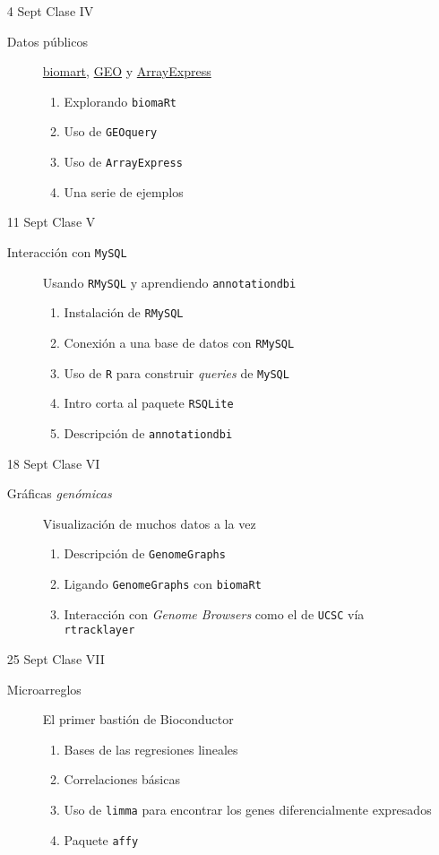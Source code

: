 \documentclass[letterpaper,12pt]{article}
\newcommand{\pl}[1]{\texttt{#1}}
\newcommand{\myurlshort}[2]{\href{http://#1}{{\textsf{#2}}}}
\begin{document}
\begin{itemize}
  \item[4 Sept] Clase IV
  \begin{description}
  \item[Datos públicos] \myurlshort{biomart.org}{biomart}, \myurlshort{ncbi.nlm.nih.gov/geo/}{GEO} y \myurlshort{ebi.ac.uk/microarray-as/ae/}{ArrayExpress}
  \begin{enumerate}
  \item Explorando \pl{biomaRt}
  \item Uso de \pl{GEOquery}
  \item Uso de \pl{ArrayExpress}
  \item Una serie de ejemplos
  \end{enumerate}
  \end{description}
  
  \item[11 Sept] Clase V
  \begin{description}
  \item[Interacción con \pl{MySQL}] Usando \pl{RMySQL} y aprendiendo \pl{annotationdbi}
  \begin{enumerate}
  \item Instalación de \pl{RMySQL}
  \item Conexión a una base de datos con \pl{RMySQL}
  \item Uso de \pl{R} para construir \emph{queries} de \pl{MySQL}
  \item Intro corta al paquete \pl{RSQLite}
  \item Descripción de \pl{annotationdbi}
  \end{enumerate}
  \end{description}
  
  \item[18 Sept] Clase VI
  \begin{description}
  \item[Gráficas \emph{genómicas}] Visualización de muchos datos a la vez
  \begin{enumerate}
  \item Descripción de \pl{GenomeGraphs}
  \item Ligando \pl{GenomeGraphs} con \pl{biomaRt}
  \item Interacción con \emph{Genome Browsers} como el de \pl{UCSC} vía \pl{rtracklayer}
  \end{enumerate}
  \end{description}
  
  \item[25 Sept] Clase VII
  \begin{description}
  \item[Microarreglos] El primer bastión de Bioconductor
  \begin{enumerate}
  \item Bases de las regresiones lineales
  \item Correlaciones básicas
  \item Uso de \pl{limma} para encontrar los genes diferencialmente expresados
  \item Paquete \pl{affy}
  \end{enumerate}
  \end{description}
  

\end{itemize}
\end{document}
